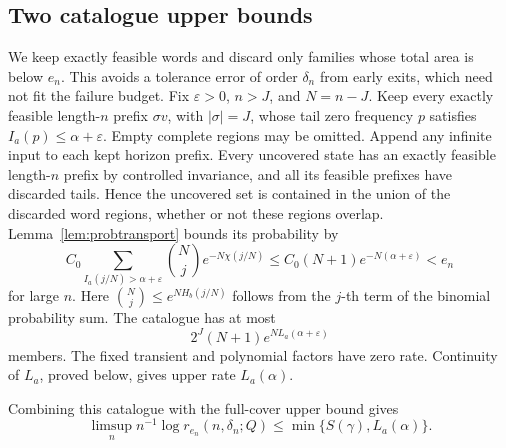 \documentclass[11pt]{amsart}
\theoremstyle{definition}
\theoremstyle{remark}
\numberwithin{equation}{section}
\begin{document}
\subsection{Two catalogue upper bounds}
We keep exactly feasible words and discard only families whose
total area is below $e_n$. This avoids a tolerance error of order
$\delta_n$ from early exits, which need not fit the failure budget.
Fix $\varepsilon>0$, $n>J$, and $N=n-J$.
Keep every exactly feasible length-$n$ prefix $\sigma v$, with
$|\sigma|=J$, whose tail zero frequency $p$ satisfies
$I_a(p)\le\alpha+\varepsilon$. Empty complete regions may be omitted.
Append any infinite input to each kept horizon prefix.
Every uncovered state has an exactly feasible length-$n$ prefix
by controlled invariance, and all its feasible prefixes have
discarded tails. Hence the uncovered set is contained in the union
of the discarded word regions, whether or not these regions overlap.
Lemma~\ref{lem:probtransport} bounds its probability by
\begin{equation}\label{eq:reliablefailure}
C_0\sum_{I_a(j/N)>\alpha+\varepsilon}
\binom Nj e^{-N\chi(j/N)}
\le C_0(N+1)e^{-N(\alpha+\varepsilon)}<e_n
\end{equation}
for large $n$. Here $\binom Nj\le e^{NH_b(j/N)}$ follows
from the $j$-th term of the binomial probability sum. The catalogue
has at most
\begin{equation}\label{eq:reliablecount}
2^J(N+1)e^{N L_a(\alpha+\varepsilon)}
\end{equation}
members. The fixed transient and polynomial factors have zero rate.
Continuity of $L_a$, proved below, gives upper rate $L_a(\alpha)$.

Combining this catalogue with the full-cover upper bound gives
\begin{equation}\label{eq:reliableupper}
\limsup_n n^{-1}\log r_{e_n}(n,\delta_n;Q)
                       \le\min\{S(\gamma),L_a(\alpha)\}.
\end{equation}
\end{document}
